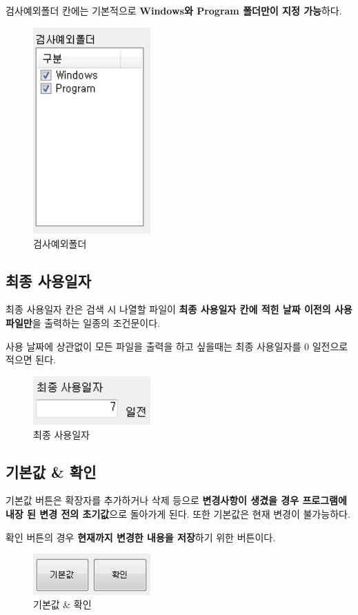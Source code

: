 \documentclass[a4paper, 13pt]{article} %
\begin{document}
	검사예외폴더 칸에는 기본적으로 \textbf{Windows와 Program 폴더만이 지정 가능}하다.
	
	\begin{figure}[h]
		\centering
		\includegraphics[width=0.4\textwidth]{Figures/except}
		\caption{검사예외폴더}
		\label{fig:except}
	\end{figure}

	\subsection{최종 사용일자}	
	최종 사용일자 칸은 검색 시 나열할 파일이 \textbf{최종 사용일자 칸에 적힌 날짜 이전의 사용 파일만}을 출력하는 일종의 조건문이다.
	
	사용 날짜에 상관없이 모든 파일을 출력을 하고 싶을때는 최종 사용일자를 0 일전으로 적으면 된다.
	
	\begin{figure}[h]
		\centering
		\includegraphics[width=0.4\textwidth]{Figures/date}
		\caption{최종 사용일자}
		\label{fig:date}
	\end{figure}

	\subsection{기본값 \& 확인}
	기본값 버튼은 확장자를 추가하거나 삭제 등으로 \textbf{변경사항이 생겼을 경우 프로그램에 내장 된 변경 전의 초기값}으로 돌아가게 된다. 또한 기본값은 현재 변경이 불가능하다.
	
	확인 버튼의 경우 \textbf{현재까지 변경한 내용을 저장}하기 위한 버튼이다.
	
	\begin{figure}[h]
		\centering
		\includegraphics[width=0.4\textwidth]{Figures/button}
		\caption{기본값 \& 확인}
		\label{fig:button}
	\end{figure}
\end{document}
